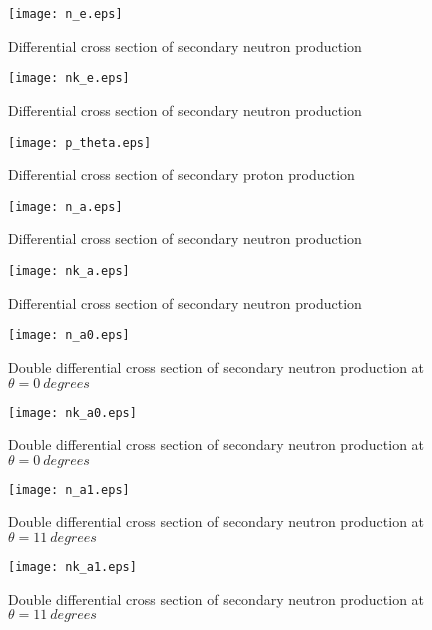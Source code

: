 \documentclass[12pt]{article}
\begin{document}
\newpage

\begin{figure}[htbp]
\caption{Differential cross section of secondary neutron production}
\label{fig7}  
\centerline{\texttt{[image: n\_e.eps]}}
\end{figure}
\begin{figure}[htbp]
\caption{Differential cross section of secondary neutron production}
\label{fig8}  
\centerline{\texttt{[image: nk\_e.eps]}}
\end{figure}
\begin{figure}[htbp]
\caption{Differential cross section of secondary proton production}
\label{fig9} 
\centerline{\texttt{[image: p\_theta.eps]}}
\end{figure}
\begin{figure}[htbp]
\caption{Differential cross section of secondary neutron production}
\label{fig10} 
\centerline{\texttt{[image: n\_a.eps]}}
\end{figure}
\begin{figure}[htbp]
\caption{Differential cross section of secondary neutron production}
\label{fig10a} 
\centerline{\texttt{[image: nk\_a.eps]}}
\end{figure}

\clearpage


\begin{figure}[htbp]
\caption{Double differential cross section of secondary neutron production at $\theta = 0~degrees$}
\label{figa0} 
\centerline{\texttt{[image: n\_a0.eps]}}
\end{figure}

\begin{figure}[htbp]
\caption{Double differential cross section of secondary neutron production at $\theta = 0~degrees$}
\label{figa0a} 
\centerline{\texttt{[image: nk\_a0.eps]}}
\end{figure}


\begin{figure}[htbp]
\caption{Double differential cross section of secondary neutron production at $\theta = 11~degrees$}
\label{figa1} 
\centerline{\texttt{[image: n\_a1.eps]}}
\end{figure}

\begin{figure}[htbp]
\caption{Double differential cross section of secondary neutron production at $\theta = 11~degrees$}
\label{figa1a} 
\centerline{\texttt{[image: nk\_a1.eps]}}
\end{figure}
\end{document}
